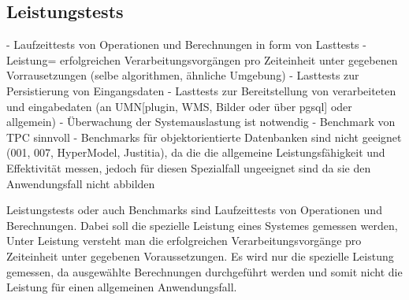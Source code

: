 
\subsection{Leistungstests}
\label{Leistungstests}

- Laufzeittests von Operationen und Berechnungen in form von Lasttests
- Leistung=  erfolgreichen Verarbeitungsvorgängen pro Zeiteinheit unter gegebenen Vorrausetzungen (selbe algorithmen, ähnliche Umgebung)
- Lasttests zur Persistierung von Eingangsdaten
- Lasttests zur Bereitstellung von verarbeiteten und eingabedaten (an UMN[plugin, WMS, Bilder oder über pgsql] oder allgemein)
- Überwachung der Systemauslastung ist notwendig
- Benchmark von TPC sinnvoll
- Benchmarks für objektorientierte Datenbanken sind nicht geeignet (001, 007, HyperModel, Justitia), da die die allgemeine Leistungsfähigkeit und Effektivität messen, jedoch für diesen Spezialfall ungeeignet sind da sie den Anwendungsfall nicht abbilden

Leistungstests oder auch Benchmarks sind Laufzeittests von Operationen und Berechnungen.
Dabei soll die spezielle Leistung eines Systemes gemessen werden,
Unter Leistung versteht man die erfolgreichen Verarbeitungsvorgänge pro Zeiteinheit unter gegebenen Voraussetzungen.
Es wird nur die spezielle Leistung gemessen, da ausgewählte Berechnungen durchgeführt werden und somit nicht die Leistung für einen allgemeinen Anwendungsfall.

